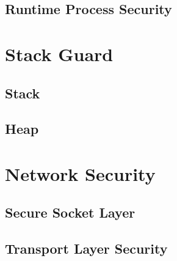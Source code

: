 

\subsection{Runtime Process Security}
\label{sec:RuntimeProcessSecurity}

\section{Stack Guard}
\label{sec:StackGuard}
\subsection{Stack}
\label{sec:Stack}
\subsection{Heap}
\label{sec:Heap}






\section{Network Security}
\label{sec:NetworkSecurity}

\subsection{Secure Socket Layer}
\label{sec:SSL}

\subsection{Transport Layer Security}
\label{sec:TLS}

